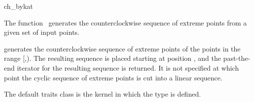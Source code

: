 
\begin{ccRefFunction}{ch_bykat}  

\ccDefinition
  
The function \ccRefName\ generates the counterclockwise sequence of extreme
points from a given set of input points.



            {generates the counterclockwise sequence of extreme points
            of the points in the range [,).
            The resulting sequence is placed starting at position
            , and the past-the-end iterator for the resulting
            sequence is returned. It is not specified at which point the
            cyclic sequence of extreme points is cut into a linear sequence.
            \ccPrecond{ %
            The source range [\ccc{first},\ccc{beyond}) does not contain
            \ccc{result}.}}

The default traits class  is the kernel in which the
type  is defined.



\end{ccRefFunction}

